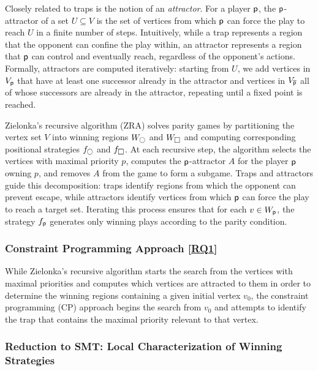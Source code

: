 \documentclass{article}
\begin{document}
Closely related to traps is the notion of an \emph{attractor}. For a player $\player$, the $\player$-attractor of a set $U \subseteq V$ is the set of vertices from which $\player$ can force the play to reach $U$ in a finite number of steps. Intuitively, while a trap represents a region that the opponent can confine the play within, an attractor represents a region that $\player$ can control and eventually reach, regardless of the opponent's actions. Formally, attractors are computed iteratively: starting from $U$, we add vertices in $V_\player$ that have at least one successor already in the attractor and vertices in $V_{\opponent}$ all of whose successors are already in the attractor, repeating until a fixed point is reached. 

Zielonka's recursive algorithm (ZRA) solves parity games by partitioning the vertex set $V$ into winning regions $W_{\even}$ and $W_{\odd}$ and computing corresponding positional strategies $f_{\even}$ and $f_{\odd}$. At each recursive step, the algorithm selects the vertices with maximal priority $p$, computes the $\player$-attractor $A$ for the player $\player$ owning $p$, and removes $A$ from the game to form a subgame. Traps and attractors guide this decomposition: traps identify regions from which the opponent can prevent escape, while attractors identify vertices from which $\player$ can force the play to reach a target set. Iterating this process ensures that for each $v \in W_{\player}$, the strategy $f_{\player}$ generates only winning plays according to the parity condition.

\subsubsection{Constraint Programming Approach [\hyperref[sec:rq]{RQ1}]}

While Zielonka's recursive algorithm starts the search from the vertices with maximal priorities and computes which vertices are attracted to them in order to determine the winning regions containing a given initial vertex $v_0$, the constraint programming (CP) approach begins the search from $v_0$ and attempts to identify the trap that contains the maximal priority relevant to that vertex.

\subsubsection{Reduction to SMT: Local Characterization of Winning Strategies}\label{sec:reductionsmt}
\end{document}

